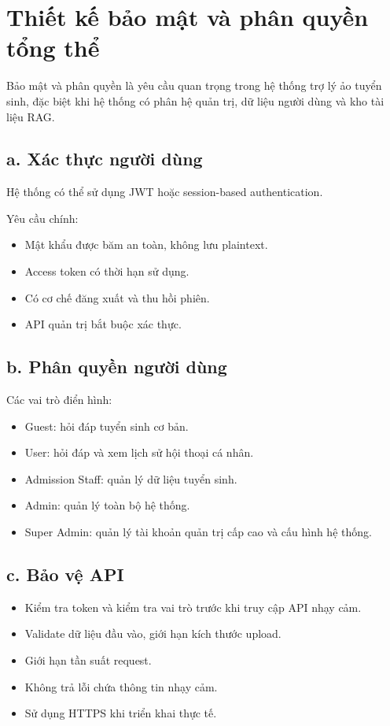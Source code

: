 ﻿\section{Thiết kế bảo mật và phân quyền tổng thể}

Bảo mật và phân quyền là yêu cầu quan trọng trong hệ thống trợ lý ảo tuyển sinh, đặc biệt khi hệ thống có phân hệ quản trị, dữ liệu người dùng và kho tài liệu RAG.

\subsection*{a. Xác thực người dùng}

Hệ thống có thể sử dụng JWT hoặc session-based authentication.

Yêu cầu chính:
\begin{itemize}
    \item Mật khẩu được băm an toàn, không lưu plaintext.
    \item Access token có thời hạn sử dụng.
    \item Có cơ chế đăng xuất và thu hồi phiên.
    \item API quản trị bắt buộc xác thực.
\end{itemize}

\subsection*{b. Phân quyền người dùng}

Các vai trò điển hình:
\begin{itemize}
    \item Guest: hỏi đáp tuyển sinh cơ bản.
    \item User: hỏi đáp và xem lịch sử hội thoại cá nhân.
    \item Admission Staff: quản lý dữ liệu tuyển sinh.
    \item Admin: quản lý toàn bộ hệ thống.
    \item Super Admin: quản lý tài khoản quản trị cấp cao và cấu hình hệ thống.
\end{itemize}

\subsection*{c. Bảo vệ API}

\begin{itemize}
    \item Kiểm tra token và kiểm tra vai trò trước khi truy cập API nhạy cảm.
    \item Validate dữ liệu đầu vào, giới hạn kích thước upload.
    \item Giới hạn tần suất request.
    \item Không trả lỗi chứa thông tin nhạy cảm.
    \item Sử dụng HTTPS khi triển khai thực tế.
\end{itemize}

